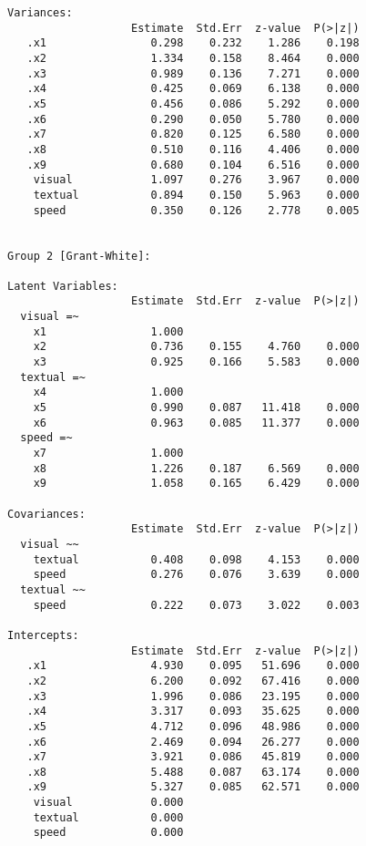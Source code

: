 \begin{verbatim}
Variances:
                   Estimate  Std.Err  z-value  P(>|z|)
   .x1                0.298    0.232    1.286    0.198
   .x2                1.334    0.158    8.464    0.000
   .x3                0.989    0.136    7.271    0.000
   .x4                0.425    0.069    6.138    0.000
   .x5                0.456    0.086    5.292    0.000
   .x6                0.290    0.050    5.780    0.000
   .x7                0.820    0.125    6.580    0.000
   .x8                0.510    0.116    4.406    0.000
   .x9                0.680    0.104    6.516    0.000
    visual            1.097    0.276    3.967    0.000
    textual           0.894    0.150    5.963    0.000
    speed             0.350    0.126    2.778    0.005


Group 2 [Grant-White]:

Latent Variables:
                   Estimate  Std.Err  z-value  P(>|z|)
  visual =~                                           
    x1                1.000                           
    x2                0.736    0.155    4.760    0.000
    x3                0.925    0.166    5.583    0.000
  textual =~                                          
    x4                1.000                           
    x5                0.990    0.087   11.418    0.000
    x6                0.963    0.085   11.377    0.000
  speed =~                                            
    x7                1.000                           
    x8                1.226    0.187    6.569    0.000
    x9                1.058    0.165    6.429    0.000

Covariances:
                   Estimate  Std.Err  z-value  P(>|z|)
  visual ~~                                           
    textual           0.408    0.098    4.153    0.000
    speed             0.276    0.076    3.639    0.000
  textual ~~                                          
    speed             0.222    0.073    3.022    0.003

Intercepts:
                   Estimate  Std.Err  z-value  P(>|z|)
   .x1                4.930    0.095   51.696    0.000
   .x2                6.200    0.092   67.416    0.000
   .x3                1.996    0.086   23.195    0.000
   .x4                3.317    0.093   35.625    0.000
   .x5                4.712    0.096   48.986    0.000
   .x6                2.469    0.094   26.277    0.000
   .x7                3.921    0.086   45.819    0.000
   .x8                5.488    0.087   63.174    0.000
   .x9                5.327    0.085   62.571    0.000
    visual            0.000                           
    textual           0.000                           
    speed             0.000                           


\end{verbatim}
